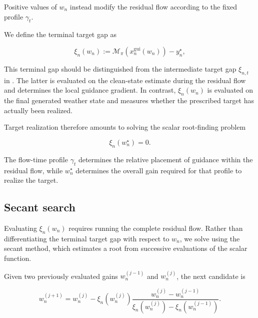 Positive values of $w_n$ instead modify the residual flow according to the
fixed profile $\gamma_t$.

We define the terminal target gap as

\begin{equation}
    \xi_n(w_n)
    :=
    \mathcal{M}_\pi
    \left(
        x_n^{\mathrm{gui}}(w_n)
    \right)
    -
    y_n^\star,
    \label{eq:terminal-target-gap}
\end{equation}

This terminal gap should be distinguished from the intermediate target gap
$\xi_{n,t}$ in . The latter is evaluated on the clean-state
estimate during the residual flow and determines the local guidance gradient.
In contrast, $\xi_n(w_n)$ is evaluated on the final generated weather state and
measures whether the prescribed target has actually been realized.

Target realization therefore amounts to solving the scalar root-finding
problem

\begin{equation}
    \xi_n(w_n^\star)
    =
    0.
    \label{eq:target-realization-root}
\end{equation}

The flow-time profile $\gamma_t$ determines the relative placement of guidance
within the residual flow, while $w_n^\star$ determines the overall gain
required for that profile to realize the target.


\subsection{Secant search}

Evaluating $\xi_n(w_n)$ requires running the complete residual flow. Rather
than differentiating the terminal target gap with respect to $w_n$, we solve
 using the secant method, which estimates a
root from successive evaluations of the scalar function.

Given two previously evaluated gains $w_n^{(j-1)}$ and $w_n^{(j)}$, the next
candidate is

\begin{equation}
    w_n^{(j+1)}
    =
    w_n^{(j)}
    -
    \xi_n
    \left(
        w_n^{(j)}
    \right)
    \frac{
        w_n^{(j)}-w_n^{(j-1)}
    }{
        \xi_n
        \left(
            w_n^{(j)}
        \right)
        -
        \xi_n
        \left(
            w_n^{(j-1)}
        \right)
    }.
    \label{eq:secant-guidance-gain}
\end{equation}

